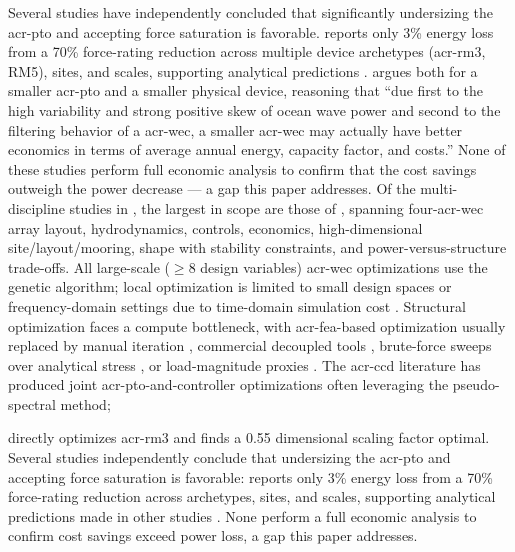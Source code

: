     Several studies have independently concluded that significantly undersizing the \gls{acr-pto} and accepting force saturation is favorable.
    \citet{mcgilton_optimal_2024} reports only 3\% energy loss from a 70\% force-rating reduction across multiple device archetypes (\gls{acr-rm3}, RM5), sites, and scales, supporting analytical predictions \citep{devin_high-dimensional_2024}.
    \citet{coe_maybe_2021} argues both for a smaller \gls{acr-pto} and a smaller physical device, reasoning that ``due first to the high variability and strong positive skew of ocean wave power and second to the filtering behavior of a \gls{acr-wec}, a smaller \gls{acr-wec} may actually have better economics in terms of average annual energy, capacity factor, and costs.''
    None of these studies perform full economic analysis to confirm that the cost savings outweigh the power decrease --- a gap this paper addresses.
    \else
    Of the multi-discipline studies in , the largest in scope are those of \citet{khanal_multi-objective_2024,gaudin_single_2021,edwards_optimisation_2022,garcia-teruel_reliability-based_2021,garcia-teruel_design_2022,cotten_multi-objective_2022}, spanning four-\gls{acr-wec} array layout, hydrodynamics, controls, economics, high-dimensional site/layout/mooring, shape with stability constraints, and power-versus-structure trade-offs.
    All large-scale ($\geq 8$ design variables) \gls{acr-wec} optimizations use the genetic algorithm; local optimization is limited to small design spaces or frequency-domain settings due to time-domain simulation cost \citep{housner_numerical_2024,garcia-teruel_reliability-based_2021,garcia-teruel_design_2022,cotten_multi-objective_2022,martins_engineering_2022}.
    Structural optimization faces a compute bottleneck, with \gls{acr-fea}-based optimization usually replaced by
    manual iteration \citep{RM3,mi_multi-scale_2025}, commercial decoupled tools \citep{an_optimal_2024}, brute-force sweeps over analytical stress \citep{ambuhl_reliability-based_2014}, or load-magnitude proxies \citep{nguyen_theoretical_2024,ferri_balancing_2014}.
    The \gls{acr-ccd} literature \citep{garcia-sanz_control_2019,coe_useful_2023} has produced joint \gls{acr-pto}-and-controller optimizations
    \citep{rosati_control_2023,son_performance_2016,anderson_re-imagining_2024,devin_high-dimensional_2024,grasberger_control_2024,gaebele_tpl_2025} often leveraging the pseudo-spectral method;
    
    \citet{gaebele_tpl_2025} directly optimizes \gls{acr-rm3} and finds a 0.55 dimensional scaling factor optimal.
    Several studies independently conclude that undersizing the \gls{acr-pto} and accepting force saturation is favorable:
    \citet{mcgilton_optimal_2024} reports only 3\% energy loss from a 70\% force-rating reduction across archetypes, sites, and scales,
    supporting analytical predictions made in other studies \citep{coe_maybe_2021,devin_high-dimensional_2024}.
    None perform a full economic analysis to confirm cost savings exceed power loss, a gap this paper addresses.
    \fi

